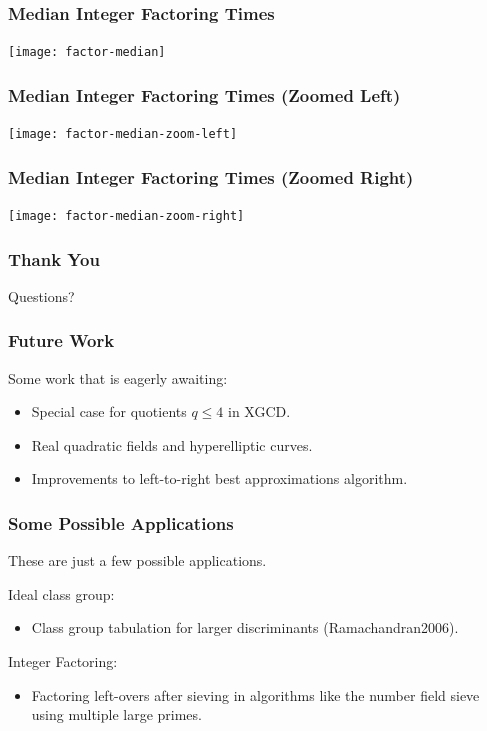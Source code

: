 \documentclass{beamer}
\begin{document}
\begin{frame}
\frametitle{Median Integer Factoring Times}
\texttt{[image: factor-median]}
\end{frame}
\begin{frame}
\frametitle{Median Integer Factoring Times (Zoomed Left)}
\texttt{[image: factor-median-zoom-left]}
\end{frame}
\begin{frame}
\frametitle{Median Integer Factoring Times (Zoomed Right)}
\texttt{[image: factor-median-zoom-right]}
\end{frame}





\begin{frame}
\frametitle{Thank You}
Questions?
\end{frame}



\begin{frame}
\end{frame}
\begin{frame}
\end{frame}
\begin{frame}
\end{frame}

\begin{frame}
\frametitle{Future Work}
Some work that is eagerly awaiting:
\begin{itemize}
\item Special case for quotients $q \le 4$ in XGCD.
\item Real quadratic fields and hyperelliptic curves.
\item Improvements to left-to-right best approximations algorithm.
\end{itemize}
\end{frame}


\begin{frame}
\frametitle{Some Possible Applications}
These are just a few possible applications. \bigskip

Ideal class group:
\begin{itemize}
\item Class group tabulation for larger discriminants \break (Ramachandran2006).
\end{itemize}

\bigskip
Integer Factoring:
\begin{itemize}
\item Factoring left-overs after sieving in algorithms like the number field sieve using multiple large primes.
\end{itemize}

\end{frame}
\end{document}
